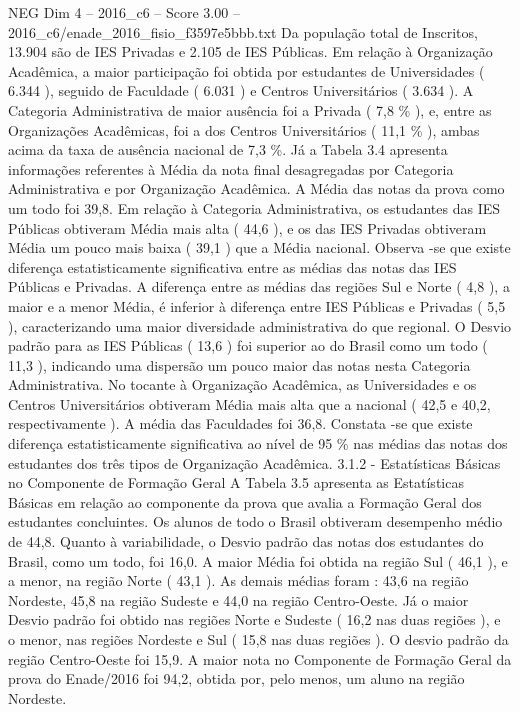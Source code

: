 \begin{textsample}{NEG Dim 4 – 2016\_c6 – Score 3.00 – 2016\_c6/enade\_2016\_fisio\_f3597e5bbb.txt}
Da população total de Inscritos, 13.904 são de IES Privadas e 2.105 de IES Públicas.
Em relação à Organização Acadêmica, a maior participação foi obtida por estudantes de Universidades ( 6.344 ), seguido de Faculdade ( 6.031 ) e Centros Universitários ( 3.634 ).
A Categoria Administrativa de maior ausência foi a Privada ( 7,8 \% ), e, entre as Organizações Acadêmicas, foi a dos Centros Universitários ( 11,1 \% ), ambas acima da taxa de ausência nacional de 7,3 \%.
Já a Tabela 3.4 apresenta informações referentes à Média da nota final desagregadas por Categoria Administrativa e por Organização Acadêmica.
A Média das notas da prova como um todo foi 39,8.
Em relação à Categoria Administrativa, os estudantes das IES Públicas obtiveram Média mais alta ( 44,6 ), e os das IES Privadas obtiveram Média um pouco mais baixa ( 39,1 ) que a Média nacional.
Observa -se que existe diferença estatisticamente significativa entre as médias das notas das IES Públicas e Privadas.
A diferença entre as médias das regiões Sul e Norte ( 4,8 ), a maior e a menor Média, é inferior à diferença entre IES Públicas e Privadas ( 5,5 ), caracterizando uma maior diversidade administrativa do que regional.
O Desvio padrão para as IES Públicas ( 13,6 ) foi superior ao do Brasil como um todo ( 11,3 ), indicando uma dispersão um pouco maior das notas nesta Categoria Administrativa.
No tocante à Organização Acadêmica, as Universidades e os Centros Universitários obtiveram Média mais alta que a nacional ( 42,5 e 40,2, respectivamente ).
A média das Faculdades foi 36,8.
Constata -se que existe diferença estatisticamente significativa ao nível de 95 \% nas médias das notas dos estudantes dos três tipos de Organização Acadêmica. 3.1.2 - Estatísticas Básicas no Componente de Formação Geral A Tabela 3.5 apresenta as Estatísticas Básicas em relação ao componente da prova que avalia a Formação Geral dos estudantes concluintes.
Os alunos de todo o Brasil obtiveram desempenho médio de 44,8.
Quanto à variabilidade, o Desvio padrão das notas dos estudantes do Brasil, como um todo, foi 16,0.
A maior Média foi obtida na região Sul ( 46,1 ), e a menor, na região Norte ( 43,1 ).
As demais médias foram : 43,6 na região Nordeste, 45,8 na região Sudeste e 44,0 na região Centro-Oeste.
Já o maior Desvio padrão foi obtido nas regiões Norte e Sudeste ( 16,2 nas duas regiões ), e o menor, nas regiões Nordeste e Sul ( 15,8 nas duas regiões ).
O desvio padrão da região Centro-Oeste foi 15,9.
A maior nota no Componente de Formação Geral da prova do Enade/2016 foi 94,2, obtida por, pelo menos, um aluno na região Nordeste.

\end{textsample}
